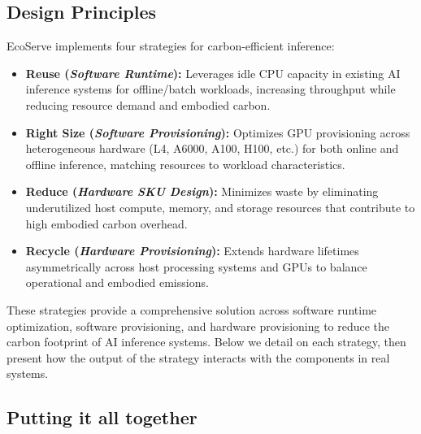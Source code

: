 \subsection{Design Principles}
EcoServe implements four strategies for carbon-efficient inference:
\begin{itemize}[leftmargin=*]
\item \textbf{Reuse (\textit{Software Runtime}):} Leverages idle CPU capacity in existing AI inference systems for offline/batch workloads, increasing throughput while reducing resource demand and embodied carbon.
\item \textbf{Right Size (\textit{Software Provisioning}):} Optimizes GPU provisioning across heterogeneous hardware (L4, A6000, A100, H100, etc.) for both online and offline inference, matching resources to workload characteristics.
\item \textbf{Reduce (\textit{Hardware SKU Design}):} Minimizes waste by eliminating underutilized host compute, memory, and storage resources that contribute to high embodied carbon overhead.
\item \textbf{Recycle (\textit{Hardware Provisioning}):} Extends hardware lifetimes asymmetrically across host processing systems and GPUs to balance operational and embodied emissions.
\end{itemize}
These strategies provide a comprehensive solution across software runtime optimization, software provisioning, and hardware provisioning to reduce the carbon footprint of AI inference systems. Below we detail on each strategy, then present how the output of the strategy interacts with the components in real systems.





\subsection{Putting it all together} \label{sec:ILP}

